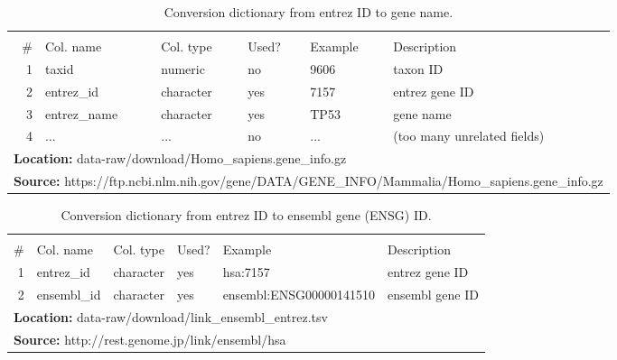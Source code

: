 \begin{table}[H]

\caption{\label{tab:entrez_names}Conversion dictionary from entrez ID to gene name.}
\centering
\begin{tabular}[t]{rlllll}
\toprule
\multicolumn{6}{c}{\bgroup\fontsize{12}{14}\selectfont \cellcolor[HTML]{EEEEEE}{\ttfamily{\textbf{entrez\_names}}}\egroup{}} \\
\cmidrule(l{3pt}r{3pt}){1-6}
\# & Col. name & Col. type & Used? & Example & Description\\
\midrule
\rowcolor{gray!6}  1 & taxid & numeric & no & 9606 & taxon ID\\
2 & entrez\_id & character & yes & 7157 & entrez gene ID\\
\rowcolor{gray!6}  3 & entrez\_name & character & yes & TP53 & gene name\\
4 & ... & ... & no & ... & (too many unrelated fields)\\
\bottomrule
\multicolumn{6}{l}{\textbf{Location: } data-raw/download/Homo\_sapiens.gene\_info.gz}\\
\multicolumn{6}{l}{\textbf{Source: } https://ftp.ncbi.nlm.nih.gov/gene/DATA/GENE\_INFO/Mammalia/Homo\_sapiens.gene\_info.gz}\\
\end{tabular}
\end{table}
\begin{table}[H]

\caption{\label{tab:link_ensembl_entrez}Conversion dictionary from entrez ID to ensembl gene (ENSG) ID.}
\centering
\begin{tabular}[t]{rlllll}
\toprule
\multicolumn{6}{c}{\bgroup\fontsize{12}{14}\selectfont \cellcolor[HTML]{EEEEEE}{\ttfamily{\textbf{link\_ensembl\_entrez}}}\egroup{}} \\
\cmidrule(l{3pt}r{3pt}){1-6}
\# & Col. name & Col. type & Used? & Example & Description\\
\midrule
\rowcolor{gray!6}  1 & entrez\_id & character & yes & hsa:7157 & entrez gene ID\\
2 & ensembl\_id & character & yes & ensembl:ENSG00000141510 & ensembl gene ID\\
\bottomrule
\multicolumn{6}{l}{\textbf{Location: } data-raw/download/link\_ensembl\_entrez.tsv}\\
\multicolumn{6}{l}{\textbf{Source: } http://rest.genome.jp/link/ensembl/hsa}\\
\end{tabular}
\end{table}

